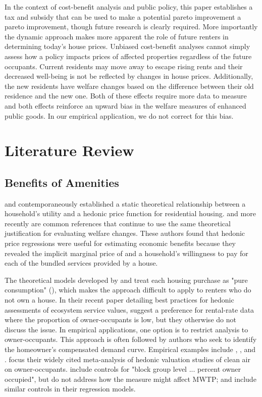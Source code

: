 \documentclass[ecta,nameyear,draft]{econsocart}
\theoremstyle{plain}
\theoremstyle{remark}
\begin{document}
In the context of cost-benefit analysis and public policy, this paper establishes a tax and subsidy that can be used to make a potential pareto improvement a pareto improvement, though future research is clearly required. More importantly the dynamic approach makes more apparent the role of future renters in determining today's house prices. Unbiased cost-benefit analyses cannot simply assess how a policy impacts prices of affected properties regardless of the future occupants. Current residents may move away to escape rising rents and their decreased well-being is not be reflected by changes in house prices. Additionally, the new residents have welfare changes based on the difference between their old residence and the new one. Both of these effects require more data to measure and both effects reinforce an upward bias in the welfare measures of enhanced public goods. In our empirical application, we do not correct for this bias.


\section{Literature Review}

\subsection{Benefits of Amenities}

\cite{rosen74} and \cite{freeman74} contemporaneously established a static theoretical relationship between a household's utility and a hedonic price function for residential housing. \cite{freeman99} and more recently \cite{freeman14} are common references that continue to use the same theoretical justification for evaluating welfare changes. These authors found that hedonic price regressions were useful for estimating economic benefits because they revealed the implicit marginal price of and a household's willingness to pay for each of the bundled services provided by a house. 

The theoretical models developed by \cite{rosen74} and \cite{freeman74} treat each housing purchase as "pure consumption" (\cite{rosen74}), which makes the approach difficult to apply to renters who do not own a house. In their recent paper detailing best practices for hedonic assessments of ecosystem service values, \cite{bishop20} suggest a preference for rental-rate data where the proportion of owner-occupants is low, but they otherwise do not discuss the issue. In empirical applications, one option is to restrict analysis to owner-occupants. This approach is often followed by authors who seek to identify the homeowner's compensated demand curve. Empirical examples include \cite{palmquist84}, \cite{zabelkiel00}, and \cite{chaygreenstone05}. \cite{smithhuang95} focus their widely cited meta-analysis of hedonic valuation studies of clean air on owner-occupants. \cite{kuminoffpope14} include controls for "block group level ... percent owner occupied", but do not address how the measure might affect MWTP; \cite{chaygreenstone05} and \cite{bento15} include similar controls in their regression models.
 
\end{document}
